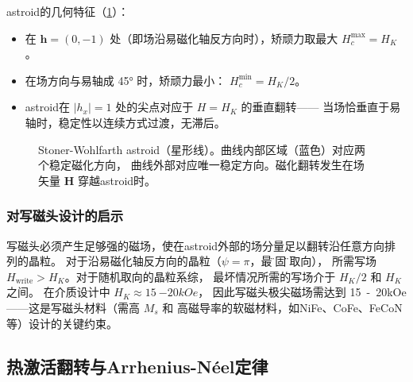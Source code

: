 \documentclass[11pt,a4paper,twoside]{article}
\theoremstyle{definition}
\theoremstyle{plain}
\theoremstyle{remark}
\begin{document}
astroid的几何特征（\cref{fig:astroid}）：
\begin{itemize}
  \item 在 $\mathbf{h} = (0, -1)$ 处（即场沿易磁化轴反方向时），矫顽力取最大
  $H_c^{\text{max}} = H_K$。
  \item 在场方向与易轴成 \ang{45} 时，矫顽力最小：
  $H_c^{\text{min}} = H_K / 2$。
  \item astroid在 $|h_x| = 1$ 处的尖点对应于 $H = H_K$ 的垂直翻转——
  当场恰垂直于易轴时，稳定性以连续方式过渡，无滞后。
\end{itemize}

\begin{figure}[H]
\centering
{}
\caption{Stoner-Wohlfarth astroid（星形线）。曲线内部区域（蓝色）对应两个稳定磁化方向，
曲线外部对应唯一稳定方向。磁化翻转发生在场矢量 $\mathbf{H}$ 穿越astroid时。}
\label{fig:astroid}
\end{figure}

\subsubsection{对写磁头设计的启示}

写磁头必须产生足够强的磁场，使在astroid外部的场分量足以翻转沿任意方向排列的晶粒。
对于沿易磁化轴反方向的晶粒（$\psi = \pi$，最\"顽固\"的取向），
所需写场 $H_{\text{write}} > H_K$。对于随机取向的晶粒系综，
最坏情况所需的写场介于 $H_K/2$ 和 $H_K$ 之间。
在介质设计中 $H_K \approx \SI{15}{-20}{kOe}$，
因此写磁头极尖磁场需达到 \SI{15}{-20}{kOe}——这是写磁头材料（需高 $M_s$ 和
高磁导率的软磁材料，如NiFe、CoFe、FeCoN等）设计的关键约束。

\subsection{热激活翻转与Arrhenius-N\'{e}el定律}
\label{sec:superpara}
\end{document}

